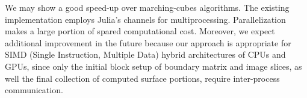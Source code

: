 \documentclass{article}
\begin{document}
We may show a good speed-up over marching-cubes algorithms. 
The existing implementation employs Julia's channels
for multiprocessing. 
Parallelization makes a large portion of spared computational cost. 
%
Moreover, we expect additional improvement in the future because our approach is appropriate  for SIMD (Single Instruction, Multiple Data) hybrid architectures of CPUs and GPUs, since only the initial block setup of boundary matrix and image slices, as well the final collection of computed surface portions, require inter-process communication. 








 
\end{document}
